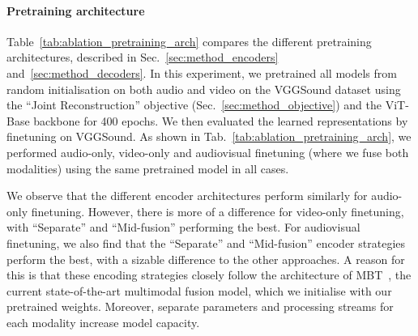 \documentclass[10pt,twocolumn,letterpaper]{article}
\begin{document}
\paragraph{Pretraining architecture}

\begin{table}[t]
\caption{Ablation study of different pretraining architectures.
Models are pretrained from random initialisation for 400 epochs on VGGSound, and then finetuned on the same dataset.
}
\vspace{-0.6\baselineskip}
\centering
{}
\vspace{-\baselineskip}


\label{tab:ablation_pretraining_arch}
\end{table}
 
Table~\ref{tab:ablation_pretraining_arch} compares the different pretraining architectures, described in Sec.~\ref{sec:method_encoders} and~\ref{sec:method_decoders}.
In this experiment, we pretrained all models from random initialisation on both audio and video on the VGGSound dataset using the ``Joint Reconstruction'' objective (Sec.~\ref{sec:method_objective}) and the ViT-Base backbone for 400 epochs.
We then evaluated the learned representations by finetuning on VGGSound.
As shown in Tab.~\ref{tab:ablation_pretraining_arch}, we performed audio-only, video-only and audiovisual finetuning (where we fuse both modalities) using the same pretrained model in all cases.

We observe that the different encoder architectures perform similarly for audio-only finetuning.
However, there is more of a difference for video-only finetuning, with ``Separate'' and ``Mid-fusion'' performing the best.
For audiovisual finetuning, we also find that the ``Separate'' and ``Mid-fusion'' encoder strategies perform the best, with a sizable difference to the other approaches.
A reason for this is that these encoding strategies closely follow the architecture of MBT~\cite{nagrani2021attention}, the current state-of-the-art multimodal fusion model, which we initialise with our pretrained weights.
Moreover, separate parameters and processing streams for each modality increase model capacity. 
\end{document}
